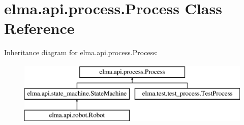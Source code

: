 \hypertarget{classelma_1_1api_1_1process_1_1Process}{}\section{elma.\+api.\+process.\+Process Class Reference}
\label{classelma_1_1api_1_1process_1_1Process}
Inheritance diagram for elma.\+api.\+process.\+Process\+:\begin{figure}[H]
\begin{center}
\leavevmode
\includegraphics[height=3.000000cm]{classelma_1_1api_1_1process_1_1Process}
\end{center}
\end{figure}
